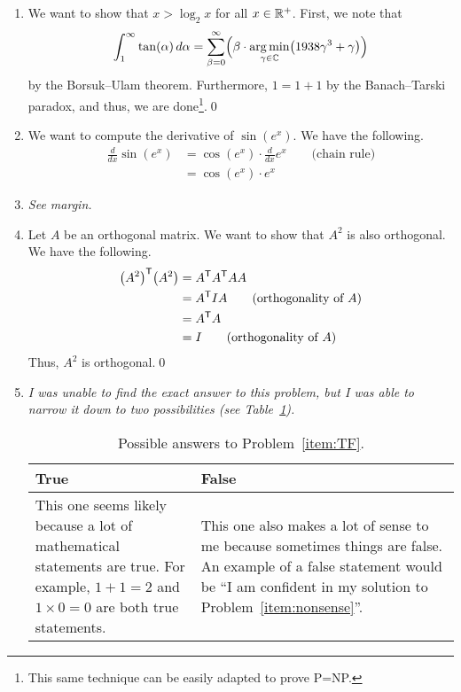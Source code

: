 \begin{enumerate}
	\item \label{item:nonsense}
	We want to show that $x > \log_2 x$ for all $x \in \mathbb{R}^+$. First, we note that
	\[\int_1^\infty \tan(\alpha) \, d\alpha = \sum_{\beta=0}^\infty \Bigl( \beta \cdot \operatorname*{arg\,min}_{\gamma \in \mathbb{C}}\bigl(1938\gamma^3 + \gamma\bigr) \Bigr)\]
	by the Borsuk--Ulam theorem. Furthermore, $1 = 1 + 1$ by the Banach--Tarski paradox, and thus, we are done\footnote{This same technique can be easily adapted to prove P=NP.}.\qed
	
	\item
	We want to compute the derivative of $\sin(e^x)$. We have the following.
	\begin{align*}
		\frac{d}{dx} \sin(e^x)
		&= \cos(e^x) \cdot \frac{d}{dx} e^x \qquad \text{(chain rule)} \\
		&= \cos(e^x) \cdot e^x
	\end{align*}
	
	\item
	\textit{See margin.}
	
	\item
	Let $A$ be an orthogonal matrix. We want to show that $A^2$ is also orthogonal. We have the following.
	\begin{align*}
		\bigl(A^2\bigr)^{\mathsf{T}} \bigl(A^2\bigr)
		&= A^{\mathsf{T}} A^{\mathsf{T}} A A \\
		&= A^{\mathsf{T}} I A \qquad \text{(orthogonality of $A$)} \\
		&= A^{\mathsf{T}} A \\
		&= I \qquad \text{(orthogonality of $A$)}
	\end{align*}
	Thus, $A^2$ is orthogonal.\qed
	
	\item \label{item:TF}
	\textit{I was unable to find the exact answer to this problem, but I was able to narrow it down to two possibilities (see Table~\ref{tab:TF}).}
	
	\begin{table}[bhpt]
		\centering
		\caption{Possible answers to Problem~\ref{item:TF}.}
		\label{tab:TF}
		\begin{tabular}{ p{2.3in} p{2.3in} }
			\toprule
			True & False \\
			\midrule
			This one seems likely because a lot of mathematical statements are true. For example, $1 + 1 = 2$ and $1 \times 0 = 0$ are both true statements. & This one also makes a lot of sense to me because sometimes things are false. An example of a false statement would be ``I am confident in my solution to Problem~\ref{item:nonsense}''. \\
			\bottomrule
		\end{tabular}
	\end{table}
	

\end{enumerate}
